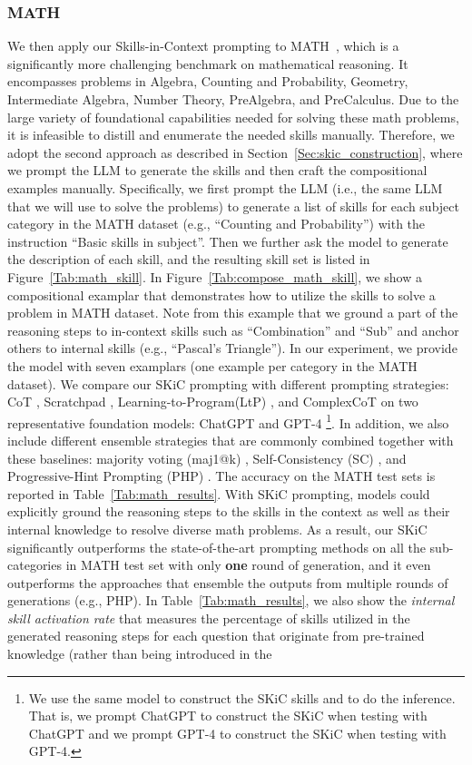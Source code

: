 \documentclass{article} \usepackage{arxiv}
\begin{document}
\subsubsection{MATH}
We then apply our Skills-in-Context prompting to MATH~\citep{hendrycks2021measuring}, which is a significantly more challenging benchmark on mathematical reasoning. It encompasses problems in Algebra, Counting and Probability, Geometry, Intermediate Algebra, Number Theory, PreAlgebra, and PreCalculus. Due to the large variety of foundational capabilities needed for solving these math problems, it is infeasible to distill and enumerate the needed skills manually. Therefore, we adopt the second approach as described in Section~\ref{Sec:skic_construction}, where we prompt the LLM to generate the skills and then craft the compositional examples manually. Specifically, we first prompt the LLM (i.e., the same LLM that we will use to solve the problems) to generate a list of skills for each subject category in the MATH dataset (e.g., ``Counting and Probability'') with the instruction ``Basic skills in subject''. Then we further ask the model to generate the description of each skill, and the resulting skill set is listed in Figure~\ref{Tab:math_skill}. In Figure~\ref{Tab:compose_math_skill}, we show a compositional examplar that demonstrates how to utilize the skills to solve a problem in MATH dataset. Note from this example that we ground a part of the reasoning steps to in-context skills such as ``Combination'' and ``Sub'' and anchor others to internal skills (e.g., ``Pascal's Triangle''). In our experiment, we provide the model with seven examplars (one example per category in the MATH dataset). We compare our SKiC prompting with different prompting strategies: CoT \citep{wei2022chain}, Scratchpad \citep{nye2021show}, Learning-to-Program(LtP) \citep{guo2023learning}, and ComplexCoT \citep{fu2022complexity} on two representative foundation models: ChatGPT and GPT-4 \footnote{We use the same model to construct the SKiC skills and to do the inference. That is, we prompt ChatGPT to construct the SKiC when testing with ChatGPT and we prompt GPT-4 to construct the SKiC when testing with GPT-4.}. In addition, we also include different ensemble strategies that are commonly combined together with these baselines: majority voting (maj1@k) \citep{lewkowycz2022solving}, Self-Consistency (SC) \citep{cot_wei_sc}, and Progressive-Hint Prompting (PHP) \citep{zheng2023progressive}. The accuracy on the MATH test sets is reported in Table~\ref{Tab:math_results}. With SKiC prompting, models could explicitly ground the reasoning steps to the skills in the context as well as their internal knowledge to resolve diverse math problems. As a result, our SKiC significantly outperforms the state-of-the-art prompting methods on all the sub-categories in MATH test set with only \textbf{one} round of generation, and it even outperforms the approaches that ensemble the outputs from multiple rounds of generations (e.g., PHP). In Table~\ref{Tab:math_results}, we also show the \emph{internal skill activation rate} that measures the percentage of skills utilized in the generated reasoning steps for each question that originate from pre-trained knowledge (rather than being introduced in the 
\end{document}
